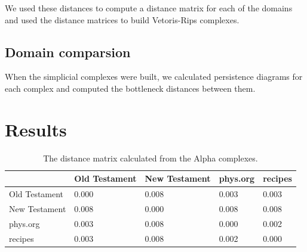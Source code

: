 \documentclass[12pt,a4paper]{amsart}
\begin{document}
We used these distances to compute a distance matrix for each of the
domains and used the distance matrices to build Vetoris-Rips complexes.

\subsection{Domain comparsion}

When the simplicial complexes were built, we calculated persistence diagrams for
each complex and computed the bottleneck distances between them.

\section{Results}

\begin{table}
  \centering
  \begin{tabular}{l|llll}
                  & Old Testament & New Testament & phys.org & recipes \\ \hline
    Old Testament & 0.000 & 0.008 & 0.003 & 0.003 \\
    New Testament & 0.008 & 0.000 & 0.008 & 0.008 \\
    phys.org      & 0.003 & 0.008 & 0.000 & 0.002 \\
    recipes       & 0.003 & 0.008 & 0.002 & 0.000 \\
  \end{tabular}
  \caption{The distance matrix calculated from the Alpha complexes.}
  \label{tab:alpha}
\end{table}
\end{document}
